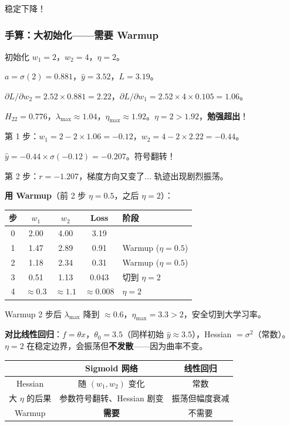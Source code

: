 \documentclass[12pt, a4paper]{ctexart}
\begin{document}
稳定下降！

\subsubsection{手算：大初始化——需要 Warmup}

初始化 $w_1 = 2$，$w_2 = 4$，$\eta = 2$。

$a = \sigma(2) = 0.881$，$\hat{y} = 3.52$，$L = 3.19$。

$\partial L/\partial w_2 = 2.52 \times 0.881 = 2.22$，$\partial L/\partial w_1 = 2.52 \times 4 \times 0.105 = 1.06$。

$H_{22} = 0.776$，$\lambda_{\max} \approx 1.04$，$\eta_{\max} \approx 1.92$。$\eta = 2 > 1.92$，\textbf{勉强超出}！

第 1 步：$w_1 = 2 - 2\times 1.06 = -0.12$，$w_2 = 4 - 2\times 2.22 = -0.44$。

$\hat{y} = -0.44 \times \sigma(-0.12) = -0.207$。符号翻转！

第 2 步：$r = -1.207$，梯度方向又变了... 轨迹出现剧烈振荡。

\textbf{用 Warmup}（前 2 步 $\eta = 0.5$，之后 $\eta = 2$）：

\begin{center}
\begin{tabular}{c|cc|c|l}
步 & $w_1$ & $w_2$ & Loss & 阶段 \\
\hline
0 & 2.00 & 4.00 & 3.19 & \\
1 & 1.47 & 2.89 & 0.91 & Warmup ($\eta=0.5$) \\
2 & 1.18 & 2.34 & 0.31 & Warmup ($\eta=0.5$) \\
3 & 0.51 & 1.13 & 0.043 & 切到 $\eta=2$ \\
4 & $\approx 0.3$ & $\approx 1.1$ & $\approx 0.008$ & $\eta=2$ \\
\end{tabular}
\end{center}

Warmup 2 步后 $\lambda_{\max}$ 降到 $\approx 0.6$，$\eta_{\max} = 3.3 > 2$，安全切到大学习率。

\textbf{对比线性回归}：$f = \theta x$，$\theta_0 = 3.5$（同样初始 $\hat{y} \approx 3.5$），Hessian $= \sigma^2$（常数）。$\eta = 2$ 在稳定边界，会振荡但\textbf{不发散}——因为曲率不变。

\begin{center}
\begin{tabular}{c|cc}
 & Sigmoid 网络 & 线性回归 \\
\hline
Hessian & 随 $(w_1,w_2)$ 变化 & 常数 \\
大 $\eta$ 的后果 & 参数符号翻转、Hessian 剧变 & 振荡但幅度衰减 \\
Warmup & \textbf{需要} & 不需要 \\
\end{tabular}
\end{center}
\end{document}
